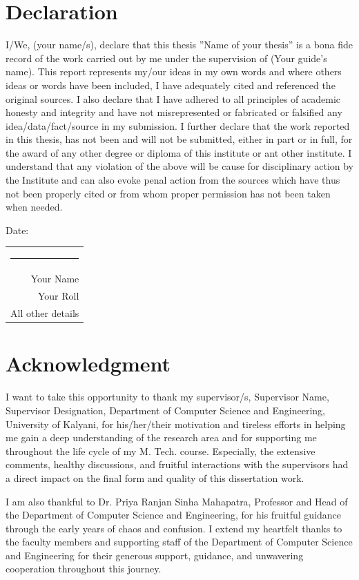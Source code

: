 \documentclass[12pt,a4paper,twoside,openright]{report}
\begin{document}
\chapter*{Declaration}
I/We, (your name/s), declare that this thesis ''Name of your thesis'' is a bona fide record of the work carried out by me under the supervision of (Your guide's name). This report represents my/our ideas in my own words and where others ideas or words have been included, I have adequately cited and referenced the original sources. I also declare that I have adhered to all principles of academic honesty and integrity and have not misrepresented or fabricated or falsified any idea/data/fact/source in my submission. I further declare that the work reported in this thesis, has not been and will not be submitted, either in part or in full, for the award of any other degree or diploma of this institute or ant other institute. I understand that any violation of the above will be cause for disciplinary action by the Institute and can also evoke penal action from the sources which have thus not been properly cited or from whom proper permission has not been taken when needed.

\vspace{3cm}
\noindent
Date: \hfill 
\begin{tabular}{r}
\rule{6cm}{0.4pt} \\
Your Name \\
Your Roll \\
All other details
\end{tabular}

\cleardoublepage %


\chapter*{Acknowledgment}
I want to take this opportunity to thank my supervisor/s, Supervisor Name, Supervisor Designation, Department of Computer Science and Engineering, University of Kalyani, for his/her/their motivation and tireless efforts in helping me gain a deep understanding of the research area and for supporting me throughout the life cycle of my M. Tech. course. Especially, the extensive comments, healthy discussions, and fruitful interactions with the supervisors had a direct impact on the final form and quality of this dissertation work.

\vspace{1em}
I am also thankful to Dr. Priya Ranjan Sinha Mahapatra, Professor and Head of the Department of Computer Science and Engineering, for his fruitful guidance through the early years of chaos and confusion. I extend my heartfelt thanks to the faculty members and supporting staff of the Department of Computer Science and Engineering for their generous support, guidance, and unwavering cooperation throughout this journey.
\end{document}
